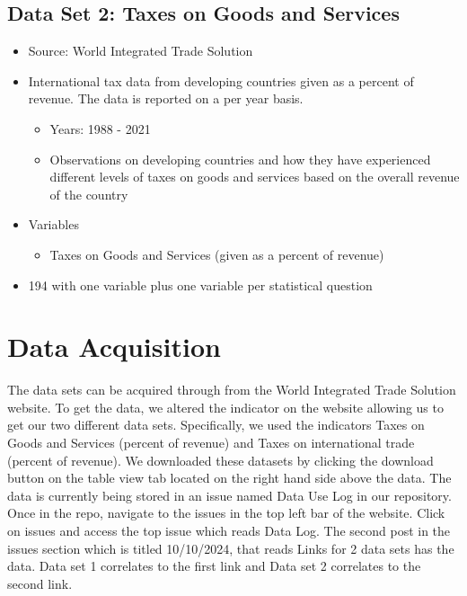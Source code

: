 \documentclass[12pt]{article}
\begin{document}
\subsection{Data Set 2: Taxes on Goods and Services}

\begin{itemize}
  \item Source: World Integrated Trade Solution
  \item International tax data from developing countries given as a percent of revenue. The data is reported on a per year basis. 
    \begin{itemize}
        \item Years: 1988 - 2021
        \item Observations on developing countries and how they have experienced different levels of taxes on goods and services based on the overall revenue of the country
    \end{itemize}
  \item Variables
    \begin{itemize}
        \item Taxes on Goods and Services (given as a percent of revenue)
    \end{itemize}
  \item 194 with one variable plus one variable per statistical question
\end{itemize}

\noindent

\section{Data Acquisition}
\label{sec:theory}

The data sets can be acquired through from the World Integrated Trade Solution website. To get the data, we altered the indicator on the website allowing us to get our two different data sets. Specifically, we used the indicators Taxes on Goods and Services (percent of revenue) and Taxes on international trade (percent of revenue). We downloaded these datasets by clicking the download button on the table view tab located on the right hand side above the data. The data is currently being stored in an issue named Data Use Log in our repository. Once in the repo, navigate to the issues in the top left bar of the website. Click on issues and access the top issue which reads Data Log. The second post in the issues section which is titled 10/10/2024, that reads Links for 2 data sets has the data. Data set 1 correlates to the first link and Data set 2 correlates to the second link.
\end{document}
